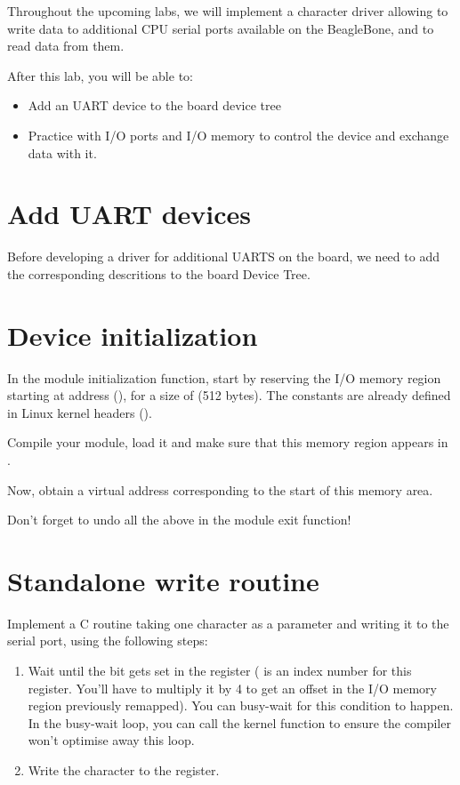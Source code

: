
Throughout the upcoming labs, we will implement a character driver
allowing to write data to additional CPU serial ports available on 
the BeagleBone, and to read data from them.

After this lab, you will be able to:

\begin{itemize}
\item Add an UART device to the board device tree
\item Practice with I/O ports and I/O memory to control the device and
  exchange data with it.
\end{itemize}

\section{Add UART devices}

Before developing a driver for additional UARTS on the board, we
need to add the corresponding descritions to the board Device Tree.

\section{Device initialization}

In the module initialization function, start by reserving the I/O
memory region starting at address (), for a size of
 (512 bytes). The  constants are already
defined in Linux kernel headers ().

Compile your module, load it and make sure that this memory region
appears in .

Now, obtain a virtual address corresponding to the start of this
memory area.

Don't forget to undo all the above in the module exit function!

\section{Standalone write routine}

Implement a C routine taking one character as a parameter and writing
it to the serial port, using the following steps:

\begin{enumerate}
\item Wait until the  bit gets set in the
   register ( is an index number for
  this register. You'll have to multiply it by 4 to get an offset in
  the I/O memory region previously remapped). You can busy-wait for
  this condition to happen. In the busy-wait loop, you can call the
   kernel function to ensure the compiler won't
  optimise away this loop.

\item Write the character to the  register.

\end{enumerate}

